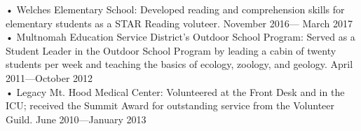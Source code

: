 \documentclass[a4paper]{article}
\begin{document}
• Welches Elementary School: Developed reading and comprehension skills for elementary students as a STAR Reading voluteer. \hfill \textcolor[RGB]{128,128,128}{November 2016— March 2017}\\
• Multnomah Education Service District's Outdoor School Program: Served as a Student Leader in the Outdoor School Program by leading a cabin of twenty students per week and teaching the basics of ecology, zoology, and geology. \hfill \textcolor[RGB]{128,128,128}{April 2011—October 2012}\\
• Legacy Mt. Hood Medical Center: Volunteered at the Front Desk and in the ICU; received the Summit Award for outstanding service from the Volunteer Guild. \hfill \textcolor[RGB]{128,128,128}{June 2010—January 2013}\\
\end{document}
